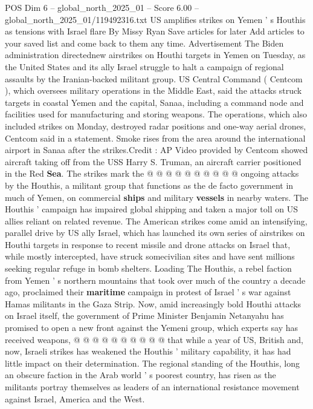 \begin{textsample}{POS Dim 6 – global\_north\_2025\_01 – Score 6.00 – global\_north\_2025\_01/119492316.txt}  \label{ex:f6_pos_274}
US amplifies strikes on Yemen ' s Houthis as tensions with Israel flare By Missy Ryan Save articles for later Add articles to your saved list and come back to them any time.
Advertisement The Biden administration directednew airstrikes on Houthi targets in Yemen on Tuesday, as the United States and its ally Israel struggle to halt a campaign of regional assaults by the Iranian-backed militant group.
US Central Command ( Centcom ), which oversees military operations in the Middle East, said the attacks struck targets in coastal Yemen and the capital, Sanaa, including a command node and facilities used for manufacturing and storing weapons.
The operations, which also included strikes on Monday, destroyed radar positions and one-way aerial drones, Centcom said in a statement.
Smoke rises from the area around the international airport in Sanaa after the strikes.Credit : AP Video provided by Centcom showed aircraft taking off from the USS Harry S.
Truman, an aircraft carrier positioned in the Red \textbf{Sea}.
The strikes mark the @ @ @ @ @ @ @ @ @ @ ongoing attacks by the Houthis, a militant group that functions as the de facto government in much of Yemen, on commercial \textbf{ships} and military \textbf{vessels} in nearby waters.
The Houthis ' campaign has impaired global shipping and taken a major toll on US allies reliant on related revenue.
The American strikes come amid an intensifying, parallel drive by US ally Israel, which has launched its own series of airstrikes on Houthi targets in response to recent missile and drone attacks on Israel that, while mostly intercepted, have struck somecivilian sites and have sent millions seeking regular refuge in bomb shelters.
Loading The Houthis, a rebel faction from Yemen ' s northern mountains that took over much of the country a decade ago, proclaimed their \textbf{maritime} campaign in protest of Israel ' s war against Hamas militants in the Gaza Strip.
Now, amid increasingly bold Houthi attacks on Israel itself, the government of Prime Minister Benjamin Netanyahu has promised to open a new front against the Yemeni group, which experts say has received weapons, @ @ @ @ @ @ @ @ @ @ that while a year of US, British and, now, Israeli strikes has weakened the Houthis ' military capability, it has had little impact on their determination.
The regional standing of the Houthis, long an obscure faction in the Arab world ' s poorest country, has risen as the militants portray themselves as leaders of an international resistance movement against Israel, America and the West.

\end{textsample}
